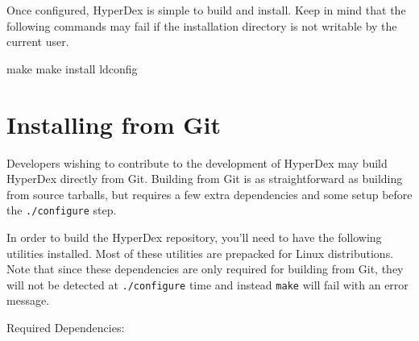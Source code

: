 Once configured, HyperDex is simple to build and install.  Keep in mind that the
following commands may fail if the installation directory is not writable by the
current user.

\begin{consolecode}
make
make install
ldconfig
\end{consolecode}

\section{Installing from Git}
\label{sec:installation:git}

Developers wishing to contribute to the development of HyperDex may build
HyperDex directly from Git.  Building from Git is as straightforward as building
from source tarballs, but requires a few extra dependencies and some setup
before the \texttt{./configure} step.

In order to build the HyperDex repository, you'll need to have the following
utilities installed.  Most of these utilities are prepacked for Linux
distributions.  Note that since these dependencies are only required for
building from Git, they will not be detected at \texttt{./configure} time and
instead \texttt{make} will fail with an error message.

Required Dependencies:


